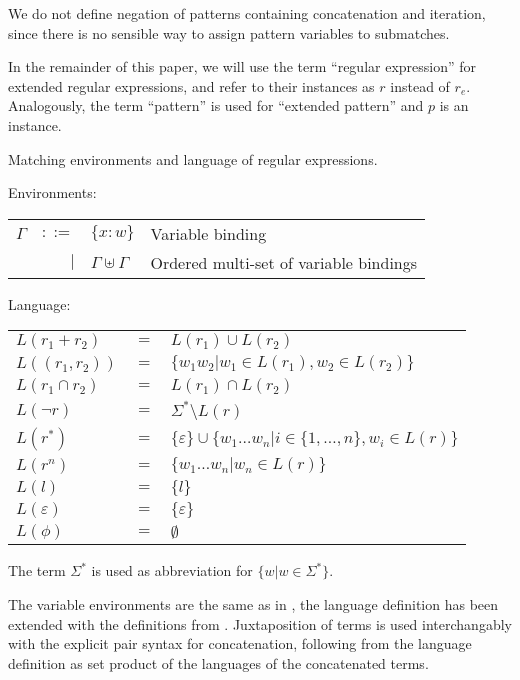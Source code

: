 We do not define negation of patterns containing concatenation and iteration,
since there is no sensible way to assign pattern variables to submatches.

In the remainder of this paper, we will use the term ``regular expression''
for extended regular expressions, and refer to their instances as $r$ instead
of $r_e$.  Analogously, the term ``pattern'' is used for ``extended pattern''
and $p$ is an instance.

\begin{defn}
   \label{defn-lang}
   Matching environments and language of regular expressions.

   Environments:

   \begin{tabular}{lrll}
      $\Gamma$	& $::=$	& $\{x:w\}$			& Variable binding	\\
		& $|$	& $\Gamma \uplus \Gamma$	& Ordered multi-set of
							  variable bindings	\\
   \end{tabular}

   Language:

   \begin{tabular}{lll}
      $L(r_1 + r_2)$	& $=$	& $L(r_1) \cup L(r_2)$					\\
      $L((r_1, r_2))$	& $=$	& $\{ w_1w_2 | w_1 \in L(r_1), w_2 \in L(r_2) \}$	\\
      $L(r_1 \cap r_2)$	& $=$	& $L(r_1) \cap L(r_2)$					\\
      $L(\neg r)$	& $=$	& $\Sigma^* \setminus L(r)$				\\
      $L(r^*)$		& $=$	&
         $\{\varepsilon\} \cup \{ w_1 \dots w_n | i
         \in \{ 1, \dots, n \}, w_i \in L(r) \}$	\\
      $L(r^n)$		& $=$	&
         $\{ w_1 \dots w_n | w_n \in L(r) \}$	\\
      $L(l)$		& $=$	& $\{l\}$						\\
      $L(\varepsilon)$	& $=$	& $\{\varepsilon\}$					\\
      $L(\phi)$		& $=$	& $\emptyset$						\\
   \end{tabular}
\end{defn}


The term $\Sigma^*$ is used as abbreviation for $\{ w | w \in \Sigma^* \}$.

The variable environments are the same as in \cite{pdpat}, the language
definition has been extended with the definitions from \cite{pd-ere}.
Juxtaposition of terms is used interchangably with the explicit pair syntax
for concatenation, following from the language definition as set product of
the languages of the concatenated terms.


